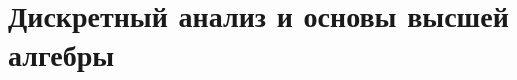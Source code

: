 \documentclass[../../book-ru.tex]{subfiles}
\begin{document}
\chapter{Дискретный анализ и основы высшей алгебры}
\label{ch:2.2-discrete-algebra-ru}
















\end{document}
